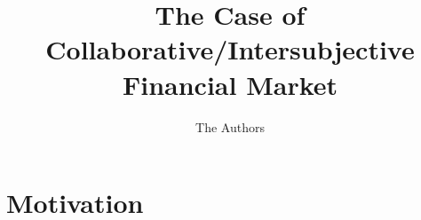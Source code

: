 \documentclass[workingdraft]{paper}
\begin{document}
\title{The Case of Collaborative/Intersubjective Financial Market}

\author{The Authors}

\begin{abstract}

\end{abstract}

\maketitle
\pagestyle{plain}

\section{Motivation}
\label{sec:motivation}



\end{document}
